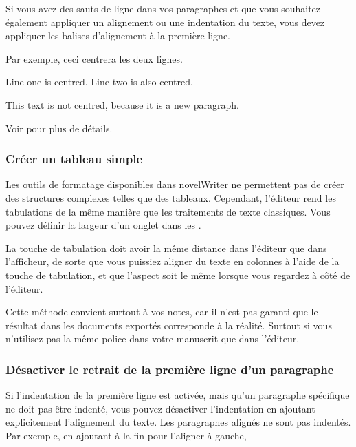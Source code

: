 \documentclass[a4paper,11pt,french]{sphinxmanual}
\begin{document}
\sphinxAtStartPar
Si vous avez des sauts de ligne dans vos paragraphes et que vous souhaitez également appliquer un alignement ou une indentation du texte, vous devez appliquer les balises d’alignement à la première ligne.

\sphinxAtStartPar
Par exemple, ceci centrera les deux lignes.

\begin{sphinxVerbatim}[commandchars=\\\{\}]
\PYGZgt{}\PYGZgt{} Line one is centred. \PYGZlt{}\PYGZlt{}
Line two is also centred.

This text is not centred, because it is a new paragraph.
\end{sphinxVerbatim}

\sphinxAtStartPar
Voir {\hyperref[\detokenize{usage_format:a-fmt-align}]{}} pour plus de détails.
\subsubsection*{Créer un tableau simple}

\sphinxAtStartPar
Les outils de formatage disponibles dans novelWriter ne permettent pas de créer des structures complexes telles que des tableaux. Cependant, l’éditeur rend les tabulations de la même manière que les traitements de texte classiques. Vous pouvez définir la largeur d’un onglet dans les .

\sphinxAtStartPar
La touche de tabulation doit avoir la même distance dans l’éditeur que dans l’afficheur, de sorte que vous puissiez aligner du texte en colonnes à l’aide de la touche de tabulation, et que l’aspect soit le même lorsque vous regardez à côté de l’éditeur.

\sphinxAtStartPar
Cette méthode convient surtout à vos notes, car il n’est pas garanti que le résultat dans les documents exportés corresponde à la réalité. Surtout si vous n’utilisez pas la même police dans votre manuscrit que dans l’éditeur.
\subsubsection*{Désactiver le retrait de la première ligne d’un paragraphe}

\sphinxAtStartPar
Si l’indentation de la première ligne est activée, mais qu’un paragraphe spécifique ne doit pas être indenté, vous pouvez désactiver l’indentation en ajoutant explicitement l’alignement du texte. Les paragraphes alignés ne sont pas indentés. Par exemple, en ajoutant \sphinxcode{\sphinxupquote{\textless{}\textless{}}} à la fin pour l’aligner à gauche,
\end{document}
